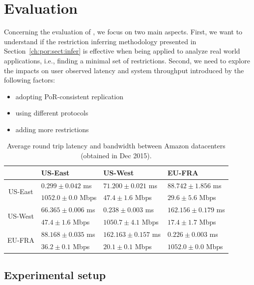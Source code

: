 \section{Evaluation}
\label{ch:por:sect:eval}

Concerning the evaluation of \coordtool, we focus on two main
aspects. First, we want to understand if the restriction inferring
methodology presented in Section~\ref{ch:por:sect:infer} is effective when being applied to
analyze real world applications, i.e., finding a minimal set of restrictions. 
Second, we need to explore the impacts on user observed latency and system throughput
introduced by the following factors: 

\begin{itemize}
\item adopting PoR-consistent replication
\item using different protocols
\item adding more restrictions
\end{itemize}




\begin{table}[t]
\centering
 \begin{tabular}{c|l|l|l|}
 & US-East & US-West & EU-FRA \\
\hline
\multirow{2}{*}{US-East} &  $0.299\pm0.042$  ms  & $71.200\pm0.021$ ms    & $88.742\pm1.856$ ms  \\
   &  $1052.0\pm0.0$ Mbps& $47.4\pm1.6$ Mbps & $29.6\pm5.6$ Mbps \\
\hline
\multirow{2}{*}{US-West} &    $66.365\pm0.006$ ms    & $0.238\pm0.003$ ms   & $162.156\pm0.179$ ms \\
   &   $47.4\pm1.6$ Mbps      & $1050.7\pm4.1$ Mbps & $17.4\pm1.7$ Mbps  \\
\hline
\multirow{2}{*}{EU-FRA} &   $88.168\pm0.035$ ms     &   $162.163\pm0.157$ ms   & $0.226\pm0.003$ ms  \\
   &    $36.2\pm0.1$ Mbps     &     $20.1\pm0.1$ Mbps     & $1052.0\pm0.0$ Mbps \\
\hline
\end{tabular}
\caption{Average round trip latency and bandwidth between Amazon datacenters (obtained in Dec 2015).}
\label{tab:por:roundtriplatency}
\end{table}


\subsection{Experimental setup}
